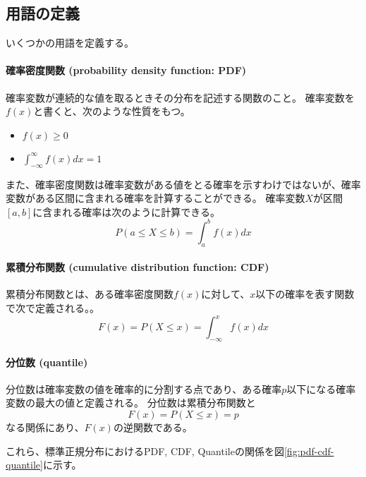\subsection{用語の定義}
いくつかの用語を定義する。

\paragraph{確率密度関数 (probability density function: PDF)}
確率変数が連続的な値を取るときその分布を記述する関数のこと。
確率変数を$f(x)$と書くと、次のような性質をもつ。
\begin{itemize}
    \item $f(x) \geq 0$
    \item $\int_{-\infty}^{\infty} f(x)dx = 1$
\end{itemize}
また、確率密度関数は確率変数がある値をとる確率を示すわけではないが、確率変数がある区間に含まれる確率を計算することができる。
確率変数$X$が区間$[a, b]$に含まれる確率は次のように計算できる。
\begin{equation}
    P(a \leq X \leq b) = \int_{a}^{b} f(x)dx
\end{equation}

\paragraph{累積分布関数 (cumulative distribution function: CDF)}
累積分布関数とは、ある確率密度関数$f(x)$に対して、$x$以下の確率を表す関数で次で定義される。。
\begin{equation}
    F(x) = P(X \leq x) = \int_{-\infty}^{x} f(x)dx
\end{equation}

\paragraph{分位数 (quantile)}
分位数は確率変数の値を確率的に分割する点であり、ある確率$p$以下になる確率変数の最大の値と定義される。
分位数は累積分布関数と
\begin{equation}
    F(x) = P(X \leq x) = p
\end{equation}
なる関係にあり、$F(x)$の逆関数である。

これら、標準正規分布におけるPDF, CDF, Quantileの関係を図\ref{fig:pdf-cdf-quantile}に示す。

